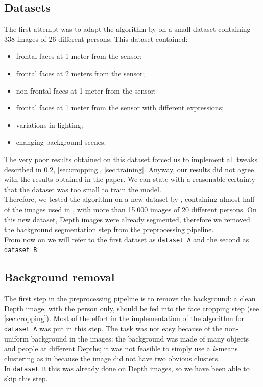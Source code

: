 \documentclass{article}
\begin{document}
\subsection{Datasets}\label{sec:datasets}
The first attempt was to adapt the algorithm by \citet{Hayat2016} on a small dataset containing 338 images of 26 different persons. This dataset contained:
\begin{itemize}
	\item frontal faces at 1 meter from the sensor;
	\item frontal faces at 2 meters from the sensor;
	\item non frontal faces at 1 meter from the sensor;
	\item frontal faces at 1 meter from the sensor with different expressions;
	\item variations in lighting;
	\item changing background scenes.
\end{itemize}
The very poor results obtained on this dataset forced us to implement all tweaks described in \ref{sec:background}, \ref{sec:cropping}, \ref{sec:training}. Anyway, our results did not agree with the results obtained in the paper. We can state with a reasonable certainty that the dataset was too small to train the model. \\
Therefore, we tested the algorithm on a new dataset by \citet{Fanelli2013}, containing almost half of the images used in \citet{Hayat2016}, with more than 15.000 images of 20 different persons. On this new dataset, Depth images were already segmented, therefore we removed the background segmentation step from the preprocessing pipeline. \\
From now on we will refer to the first dataset as \verb|dataset A| and the second as \verb|dataset B|.

\subsection{Background removal} \label{sec:background}
The first step in the preprocessing pipeline is to remove the background: a clean Depth image, with the person only, should be fed into the face cropping step (see \ref{sec:cropping}). Most of the effort in the implementation of the algorithm for \verb|dataset A| was put in this step. The task was not easy because of the non-uniform background in the images: the background was made of many objects and people at different Depths; it was not feasible to simply use a \textit{k}-means clustering as in \cite{Hayat2016} because the image did not have two obvious clusters. \\
In \verb|dataset B| this was already done on Depth images, so we have been able to skip this step. \\
\end{document}
